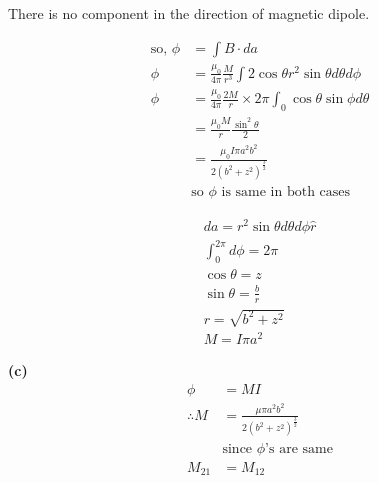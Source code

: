 \begin{enumerate}[ label=\color{ocre}\textbf{\arabic*.}]
\begin{answer}
\begin{flushright}
		\end{flushright}
		There is no component in the direction of magnetic dipole.\\  
		\begin{minipage}{0.60\textwidth}\hfill
			\begin{align*}
			\text{so, }  \phi&=\int B\cdot da\\
			\phi&=\frac{\mu_{0}}{4 \pi}\frac{M}{r^3}\int2\cos\theta r^2\sin\theta d\theta d\phi\\
			\phi&=\frac{\mu_{0}}{4\pi}\frac{2M}{r}\times2\pi\int_0\cos\theta\sin\phi d\theta\\
			&=\frac{\mu_{0}M}{r}\frac{\sin^2\theta}{2}\\
			&=\frac{\mu_{0}I\pi a^2 b^2}{2(b^2+z^2)^\frac{3}{2}}\\
			&\text{so $\phi$ is same in both cases}
			\end{align*}
		\end{minipage}
		\begin{minipage}{0.40\textwidth}
			\begin{align*}
			da=r^2\sin\theta d\theta d\phi\hat{r}\\
			\int^{2\pi}_0 d\phi=2\pi\\
			\cos\theta=z\\
			\sin\theta=\frac{b}{r}\\
			r=\sqrt{b^2+z^2}\\
			M=I\pi a^2
			\end{align*}
		\end{minipage}
		\textbf{(c)}
		\begin{align*}
		\phi&=MI\\
		\therefore M&=\frac{\mu\pi a^2 b^2}{2(b^2+z^2)^\frac{3}{2}}\\ &\text{since\ $\phi$'s are same}\\
		M_{21}&=M_{12}
		\end{align*}
	\end{answer}
	
\end{enumerate}



